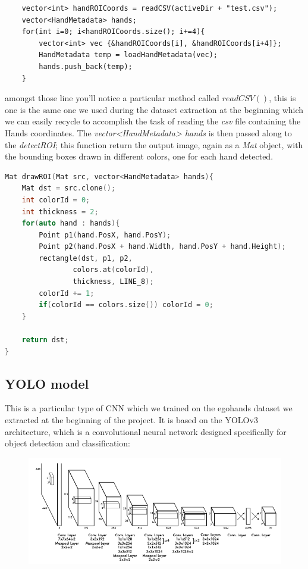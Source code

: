\begin{lstlisting}
    vector<int> handROICoords = readCSV(activeDir + "test.csv");
    vector<HandMetadata> hands;
    for(int i=0; i<handROICoords.size(); i+=4){
        vector<int> vec {&handROICoords[i], &handROICoords[i+4]};
        HandMetadata temp = loadHandMetadata(vec);
        hands.push_back(temp);
    }
\end{lstlisting}

amongst those line you'll notice a particular method called $readCSV()$, this
is one is the same one we used during the dataset extraction at the beginning
which we can easily recycle to accomplish the task of reading the \textit{csv}
file containing the Hands coordinates. The \textit{vector<HandMetadata> hands}
is then passed along to the \textit{detectROI}; this function return the output
image, again as a \textit{Mat} object, with the bounding boxes drawn in
different colors, one for each hand detected.

\begin{lstlisting}[language = c++]
    Mat drawROI(Mat src, vector<HandMetadata> hands){
    Mat dst = src.clone();
    int colorId = 0;
    int thickness = 2;
    for(auto hand : hands){
        Point p1(hand.PosX, hand.PosY);
        Point p2(hand.PosX + hand.Width, hand.PosY + hand.Height);
        rectangle(dst, p1, p2,
                colors.at(colorId),
                thickness, LINE_8);
        colorId += 1;
        if(colorId == colors.size()) colorId = 0;
    }
    
    return dst;
}

\end{lstlisting}

\subsection{YOLO model}
This is a particular type of CNN which we trained on the egohands dataset we
extracted at the beginning of the project. It is based on the YOLOv3
architecture, which is a convolutional neural network designed specifically
for object detection and classification:

\begin{figure}[!h]
    \centering
    \includegraphics[scale = 0.5]{images/yolo1_net.png}
\end{figure}


